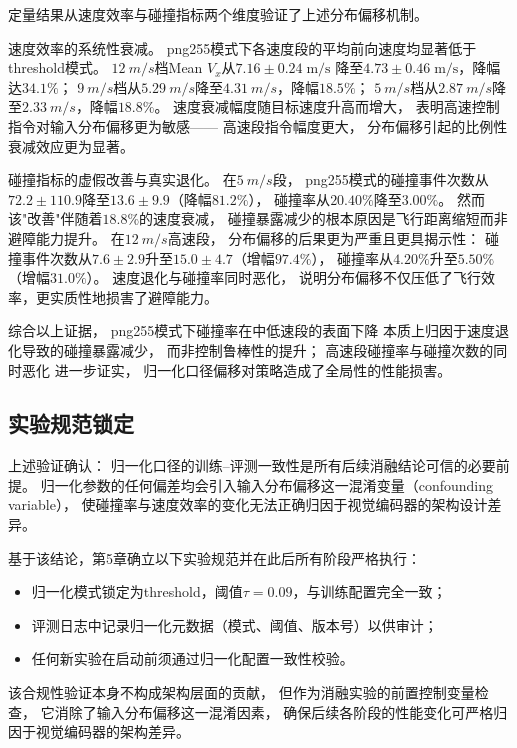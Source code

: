 定量结果从速度效率与碰撞指标两个维度验证了上述分布偏移机制。

速度效率的系统性衰减。
png255模式下各速度段的平均前向速度均显著低于threshold模式。
$\SI{12}{m/s}$档Mean $V_x$从$7.16 \pm 0.24 \;\text{m/s}$
降至$4.73 \pm 0.46 \;\text{m/s}$，降幅达$34.1\%$；
$\SI{9}{m/s}$档从$\SI{5.29}{m/s}$降至$\SI{4.31}{m/s}$，降幅$18.5\%$；
$\SI{5}{m/s}$档从$\SI{2.87}{m/s}$降至$\SI{2.33}{m/s}$，降幅$18.8\%$。
速度衰减幅度随目标速度升高而增大，
表明高速控制指令对输入分布偏移更为敏感——
高速段指令幅度更大，
分布偏移引起的比例性衰减效应更为显著。

碰撞指标的虚假改善与真实退化。
在$\SI{5}{m/s}$段，
png255模式的碰撞事件次数从$72.2 \pm 110.9$降至$13.6 \pm 9.9$（降幅$81.2\%$），
碰撞率从$20.40\%$降至$3.00\%$。
然而该"改善"伴随着$18.8\%$的速度衰减，
碰撞暴露减少的根本原因是飞行距离缩短而非避障能力提升。
在$\SI{12}{m/s}$高速段，
分布偏移的后果更为严重且更具揭示性：
碰撞事件次数从$7.6 \pm 2.9$升至$15.0 \pm 4.7$（增幅$97.4\%$），
碰撞率从$4.20\%$升至$5.50\%$（增幅$31.0\%$）。
速度退化与碰撞率同时恶化，
说明分布偏移不仅压低了飞行效率，更实质性地损害了避障能力。

综合以上证据，
png255模式下碰撞率在中低速段的表面下降
本质上归因于速度退化导致的碰撞暴露减少，
而非控制鲁棒性的提升；
高速段碰撞率与碰撞次数的同时恶化
进一步证实，
归一化口径偏移对策略造成了全局性的性能损害。

\subsection{实验规范锁定}

上述验证确认：
归一化口径的训练--评测一致性是所有后续消融结论可信的必要前提。
归一化参数的任何偏差均会引入输入分布偏移这一混淆变量（confounding variable），
使碰撞率与速度效率的变化无法正确归因于视觉编码器的架构设计差异。

基于该结论，第5章确立以下实验规范并在此后所有阶段严格执行：
\begin{itemize}
  \item 归一化模式锁定为threshold，阈值$\tau = 0.09$，与训练配置完全一致；
  \item 评测日志中记录归一化元数据（模式、阈值、版本号）以供审计；
  \item 任何新实验在启动前须通过归一化配置一致性校验。
\end{itemize}

该合规性验证本身不构成架构层面的贡献，
但作为消融实验的前置控制变量检查，
它消除了输入分布偏移这一混淆因素，
确保后续各阶段的性能变化可严格归因于视觉编码器的架构差异。

